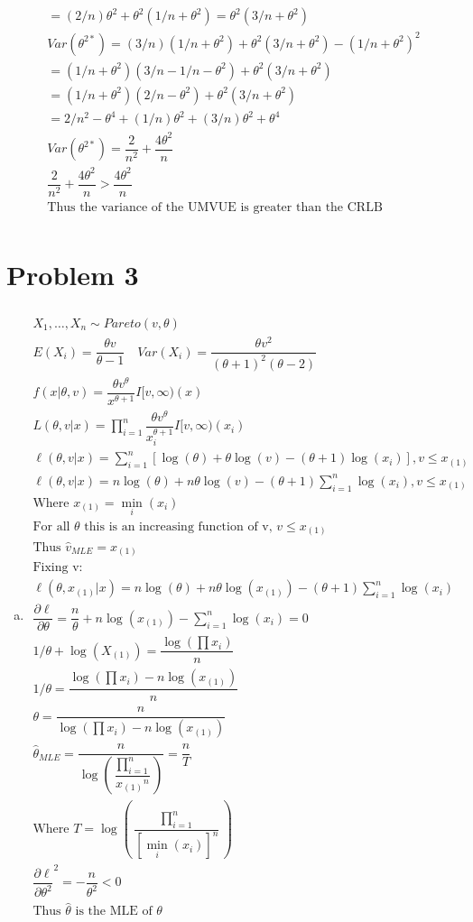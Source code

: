 \documentclass{article}
\newcommand{\sumn}{\sum_{i=1}^{n}}
\newcommand{\hth}{\hat{\theta}}
\newcommand{\prodn}{\prod_{i=1}^{n}}
\newcommand{\dll}[1]{\dfrac{\partial\ell}{\partial{#1}}}
\newcommand{\mle}{\hat{\theta}_{MLE}}
\newcommand{\ta}{\theta}
\newcommand{\samp}{X_1,\dots,X_n \sim}
\begin{document}
\begin{flushleft}
\begin{multline*}
=(2/n)\ta^2+\ta^2(1/n+\ta^2)=\ta^2(3/n+\ta^2)\\
Var(\ta^{2*})=(3/n)(1/n+\ta^2)+\ta^2(3/n+\ta^2)-(1/n+\ta^2)^2\\
=(1/n+\ta^2)(3/n-1/n-\ta^2)+\ta^2(3/n+\ta^2)\\
=(1/n+\ta^2)(2/n-\ta^2)+\ta^2(3/n+\ta^2)\\
=2/n^2-\ta^4+(1/n)\ta^2+(3/n)\ta^2+\ta^4\\
Var(\ta^{2*})=\dfrac{2}{n^2}+\dfrac{4\ta^2}{n}\\
\dfrac{2}{n^2}+\dfrac{4\ta^2}{n}> \dfrac{4\ta^2}{n}\\
\text{Thus the variance of the UMVUE is greater than the CRLB}\\
\end{multline*}

	\section*{Problem 3}
	
\begin{enumerate}[(a)]
	\item 
\begin{multline*}\\
\samp Pareto(v,\ta)\\
E(X_i)=\dfrac{\ta v}{\ta-1} \quad Var(X_i)=\dfrac{\ta v^2}{(\ta+1)^2(\ta-2)}\\
f(x|\ta,v)=\dfrac{\ta v^\ta}{x^{\ta+1}}I[v,\infty)(x)\\
L(\ta,v|x)=\prodn \dfrac{\ta v^\ta}{x_i^{\ta+1}}I[v,\infty)(x_i)\\
\ell(\ta,v|x)=\sumn [\log(\ta)+\ta\log(v)-(\ta+1)\log(x_i)], v\leq x_{(1)}\\
\ell(\ta,v|x)=n\log(\ta)+n\ta\log(v)-(\ta+1)\sumn \log(x_i), v\leq x_{(1)}\\
\text{Where } x_{(1)}=\min_i(x_i)\\
\text{For all } \ta \text{ this is an increasing function of v, } v\leq x_{(1)}\\
\text{Thus } \hat{v}_{MLE}=x_{(1)}\\
\text{Fixing v:}\\
\ell(\ta,x_{(1)}|x)=n\log(\ta)+n\ta\log(x_{(1)})-(\ta+1)\sumn \log(x_i)\\
\dll{\ta}=\dfrac{n}{\ta}+n\log(x_{(1)})-\sumn \log(x_i)=0\\
1/\ta+\log(X_{(1)})=\dfrac{\log\left(\prod x_i\right)}{n}\\
1/\ta=\dfrac{\log\left(\prod x_i\right)-n\log(x_{(1)})}{n}\\
\ta=\dfrac{n}{\log\left(\prod x_i\right)-n\log(x_{(1)})}\\
\mle=\dfrac{n}{\log\left(\dfrac{\prodn}{{x_{(1)}}^n}\right)}=\dfrac{n}{T}\\
\text{Where } T=\log\left(\dfrac{\prodn}{[\min_i(x_i)]^n}\right)\\
\dll{\ta^2}^2=-\dfrac{n}{\ta^2}<0\\
\text{Thus } \hth \text{ is the MLE of } \ta\\ 
\end{multline*}
	

\end{enumerate}
\end{flushleft}
\end{document}

